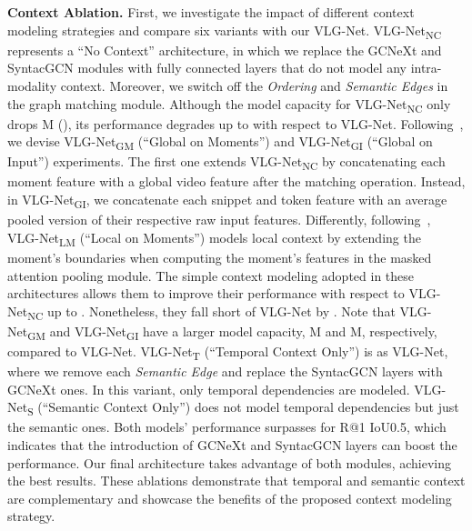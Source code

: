 \documentclass[10pt,twocolumn,letterpaper]{article}
\begin{document}
\noindent\textbf{Context Ablation.} First, we investigate the impact of different context modeling strategies and compare six variants with our VLG-Net. VLG-Net\textsubscript{NC} represents a ``No Context'' architecture, in which we replace the GCNeXt and SyntacGCN modules with fully connected layers that do not model any intra-modality context. Moreover, we switch off the \textit{Ordering} and \textit{Semantic Edges} in the graph matching module. 
Although the model capacity for VLG-Net\textsubscript{NC} only drops M (), its performance degrades up to   with respect to VLG-Net.
Following~\cite{Hendricks_2017_ICCV}, we devise VLG-Net\textsubscript{GM} (``Global on Moments'') and VLG-Net\textsubscript{GI} (``Global on Input'') experiments. The first one extends VLG-Net\textsubscript{NC} by concatenating each moment feature with a global video feature after the matching operation. Instead, in VLG-Net\textsubscript{GI}, we concatenate each snippet and token feature with an average pooled version of their respective raw input features. 
Differently, following~\cite{Gao_2017_ICCV}, VLG-Net\textsubscript{LM} (``Local on Moments'') models local context by extending the moment's boundaries when computing the moment's features in the masked attention pooling module. 
The simple context modeling adopted in these architectures allows them to improve their performance with respect to VLG-Net\textsubscript{NC} up to . Nonetheless, they fall short of VLG-Net by . 
Note that VLG-Net\textsubscript{GM} and VLG-Net\textsubscript{GI} have a larger model capacity, M and M, respectively, compared to VLG-Net.
VLG-Net\textsubscript{T} (``Temporal Context Only'') is as VLG-Net, where we remove each \textit{Semantic Edge} and replace the SyntacGCN layers with GCNeXt ones. In this variant, only temporal dependencies are modeled. VLG-Net\textsubscript{S} (``Semantic Context Only'') does not model temporal dependencies but just the semantic ones. 
Both models' performance surpasses  for R@1 IoU0.5, which indicates that the introduction of GCNeXt and SyntacGCN layers can boost the performance.  
Our final architecture takes advantage of both modules, achieving the best results. These ablations demonstrate that temporal and semantic context are complementary and showcase the benefits of the proposed context modeling strategy. 
\end{document}
